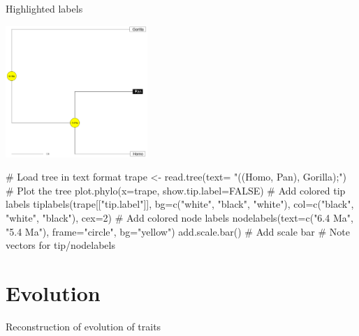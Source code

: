 \documentclass[compress, ucs, xelatex, 11pt, xcolor=svgnames,
	hyperref={
		bookmarks=true,
		unicode=true,
		colorlinks=true,
		pdftitle={Molecular data in R},
		plainpages=false,
		pdfauthor={Vojtech Zeisek},
		pdfsubject={Course about phylogeny and evolution in R},
		pdfcreator={XeLaTeX},
		pdfkeywords={R, evolution, phylogeny, molecular data},
		linkcolor=Tomato,
		anchorcolor=SaddleBrown,
		citecolor=Goldenrod,
		filecolor=DarkMagenta,
		menucolor=Sienna,
		urlcolor=DarkTurquoise,
		pdftex},
	url={hyphens, lowtilde} %
	]{beamer}
\begin{document}
\begin{frame}[fragile]{Highlighted labels}
	\begin{multicols}{2}
		\vfill
		\includegraphics[height=5cm]{highlight.png}
		\vfill
		\begin{spluscode}
    # Load tree in text format
    trape <- read.tree(text=
      "((Homo, Pan), Gorilla);")
    # Plot the tree
    plot.phylo(x=trape,
      show.tip.label=FALSE)
    # Add colored tip labels
    tiplabels(trape[["tip.label"]],
      bg=c("white", "black",
      "white"), col=c("black",
      "white", "black"), cex=2)
    # Add colored node labels
    nodelabels(text=c("6.4 Ma",
      "5.4 Ma"), frame="circle",
      bg="yellow")
    add.scale.bar() # Add scale bar
    # Note vectors for tip/nodelabels
		\end{spluscode}
	\end{multicols}
\end{frame}

\section{Evolution}

\begin{frame}{Reconstruction of evolution of traits}
	\tableofcontents[currentsection, sectionstyle=show/hide, hideothersubsections]
\end{frame}
\end{document}
